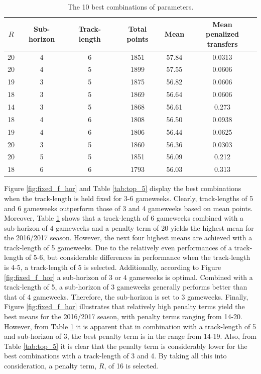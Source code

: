 \begin{table}[H]
\centering
\begin{tabular}{|c|c|c|c|c|c|}
\hline
$R$ & Sub-horizon & Track-length & Total points & Mean & \makecell{Mean \\ penalized transfers} \\
\hline
20      & 4       & 6                & 1851         & 57.84 & 0.0313 \\
20      & 4       & 5                & 1899         & 57.55 & 0.0606 \\
19      & 3       & 5                & 1875         & 56.82 & 0.0606 \\
18      & 3       & 5                & 1869         & 56.64 & 0.0606 \\
14      & 3       & 5                & 1868         & 56.61 & 0.273  \\
18      & 4       & 6                & 1808         & 56.50 & 0.0938 \\
19      & 4       & 6                & 1806         & 56.44 & 0.0625 \\
20      & 3       & 5                & 1860         & 56.36 & 0.0303 \\
20      & 5       & 5                & 1851         & 56.09 & 0.212  \\
18      & 6       & 6                & 1793         & 56.03 & 0.313  \\
\hline
\end{tabular}
\caption{The 10 best combinations of parameters.}
\label{tab:top_10}
\end{table}


Figure \ref{fig:fixed_f_hor} and Table \ref{tab:top_5} display the best combinations when the track-length is held fixed for 3-6 gameweeks. Clearly, track-lengths of 5 and 6 gameweeks outperform those of 3 and 4 gameweeks based on mean points. Moreover, Table \ref{tab:top_10} shows that a track-length of 6 gameweeks combined with a sub-horizon of 4 gameweeks and a penalty term of 20 yields the highest mean for the 2016/2017 season. However, the next four highest means are achieved with a track-length of 5 gameweeks. Due to the relatively even performances of a track-length of 5-6, but considerable differences in performance when the track-length is 4-5, a track-length of 5 is selected. Additionally, according to Figure \ref{fig:fixed_f_hor} a sub-horizon of 3 or 4 gameweeks is optimal. Combined with a track-length of 5, a sub-horizon of 3 gameweeks generally performs better than that of 4 gameweeks. Therefore, the sub-horizon is set to 3 gameweeks. Finally, Figure \ref{fig:fixed_f_hor} illustrates that relatively high penalty terms yield the best means for the 2016/2017 season, with penalty terms ranging from 14-20. However, from Table \ref{tab:top_10} it is apparent that in combination with a track-length of 5 and sub-horizon of 3, the best penalty term is in the range from 14-19. Also, from Table \ref{tab:top_5} it is clear that the penalty term is considerably lower for the best combinations with a track-length of 3 and 4. By taking all this into consideration, a penalty term, $R$, of 16 is selected.


